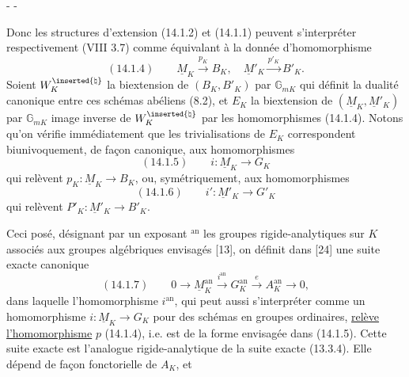 \begin{center}-  -\end{center}
Donc les structures d'extension (14.1.2) et (14.1.1) peuvent
s'interpréter respectivement (VIII 3.7) comme équivalant à la donnée
d'homomorphisme
\[
(14.1.4)\qquad\underline M_K\xrightarrow{p_K}B_K,\quad
\underline M'_K\xrightarrow{p'_K}B'_K.
\]
Soient $W_K^{\inserted{\natural}}$ la biextension de $(B_K,B'_K)$ par $\mathbb G_{mK}$ qui définit la
dualité canonique entre ces schémas abéliens (8.2), et $E_K$ la biextension
de $(\underline M_K,\underline M'_K)$ par $\mathbb G_{mK}$ image inverse de $W_K^{\inserted{\natural}}$ par les homomorphismes (14.1.4).
Notons qu'on vérifie immédiatement que les trivialisations de $E_K$ correspondent
biunivoquement, de façon canonique, aux homomorphismes
\[
(14.1.5)\qquad i:\underline M_K\longrightarrow G_K
\]
qui relèvent $p_K:\underline M_K\longrightarrow B_K$, ou, symétriquement, aux homomorphismes
\[
(14.1.6)\qquad i':\underline M'_K\longrightarrow G'_K
\]
qui relèvent $P'_K:\underline M'_K\longrightarrow B'_K$.

Ceci posé, désignant par un exposant $^{\mathrm{an}}$ les groupes rigide-analytiques
sur $K$ associés aux groupes algébriques envisagés [13],
on définit dans [24] une suite exacte canonique
\[
(14.1.7)\qquad0\longrightarrow\underline M_K^{\mathrm{an}}
\xrightarrow{i^{\mathrm{an}}}G_K^{\mathrm{an}}\xrightarrow{e}A_K^{\mathrm{an}}\longrightarrow0,
\]
dans laquelle l'homomorphisme $i^{\mathrm{an}}$, qui peut aussi s'interpréter comme
un homomorphisme $i:\underline M_K\longrightarrow G_K$ pour des schémas en groupes ordinaires,
\uline{relève l'homomorphisme} $p$ (14.1.4), i.e. est de la forme envisagée dans
(14.1.5). Cette suite exacte est l'analogue rigide-analytique de la
suite exacte (13.3.4). Elle dépend de façon fonctorielle de $A_K$, et
